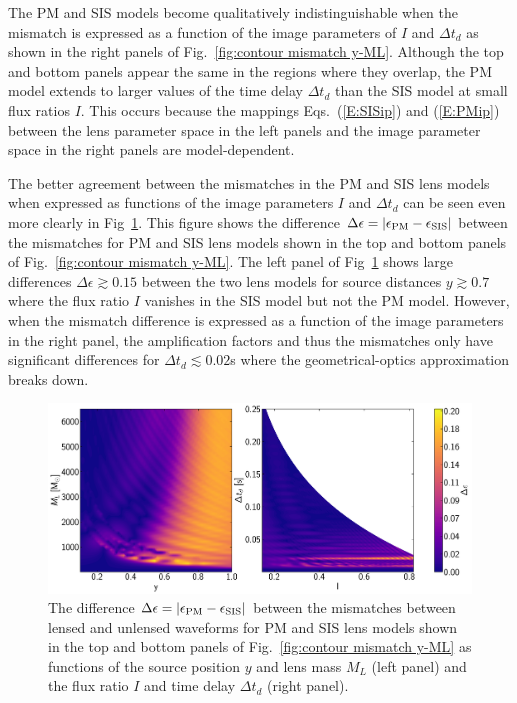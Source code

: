 \documentclass[floats,floatfix,showpacs,amssymb,prd,twocolumn,superscriptaddress,nofootinbib,nolongbibliography,reprint]{revtex4-2}
\begin{document}
The PM and SIS models become qualitatively indistinguishable when the mismatch is expressed as a function of the image parameters of $I$ and $\Delta t_d$ as shown in the right panels of Fig.~\ref{fig:contour mismatch y-ML}.  Although the top and bottom panels appear the same in the regions where they overlap, the PM model extends to larger values of the time delay $\Delta t_d$ than the SIS model at small flux ratios $I$.  This occurs because the mappings Eqs.~(\ref{E:SISip}) and (\ref{E:PMip}) between the lens parameter space in the left panels and the image parameter space in the right panels are model-dependent.

The better agreement between the mismatches in the PM and SIS lens models when expressed as functions of the image parameters $I$ and $\Delta t_d$ can be seen even more clearly in Fig~\ref{fig:contour mismatch compare}.  This figure shows the difference $\Delta\epsilon = |\epsilon_{\rm PM}-\epsilon_{\rm SIS}|$ between the mismatches for PM and SIS lens models shown in the top and bottom panels of Fig.~\ref{fig:contour mismatch y-ML}.  The left panel of Fig~\ref{fig:contour mismatch compare} shows large differences $\Delta\epsilon \gtrsim 0.15$ between the two lens models for source distances $y \gtrsim 0.7$ where the flux ratio $I$ vanishes in the SIS model but not the PM model.  However, when the mismatch difference is expressed as a function of the image parameters in the right panel, the amplification factors and thus the mismatches only have significant differences for $\Delta t_d \lesssim 0.02$s where the geometrical-optics approximation breaks down. 

\begin{figure}[ht!]
    \centering
    \includegraphics[scale = 0.43]{Figures/contour_plot_compare_lensparam.pdf}
    \caption{
    The difference $\Delta\epsilon = |\epsilon_{\rm PM} - \epsilon_{\rm SIS}|$ between the mismatches between lensed and unlensed waveforms for PM and SIS lens models shown in the top and bottom panels of Fig.~\ref{fig:contour mismatch y-ML} as functions of the source position $y$ and lens mass $M_L$ (left panel) and the flux ratio $I$ and time delay $\Delta t_d$ (right panel).
    } 
    \label{fig:contour mismatch compare}
\end{figure}
\end{document}
